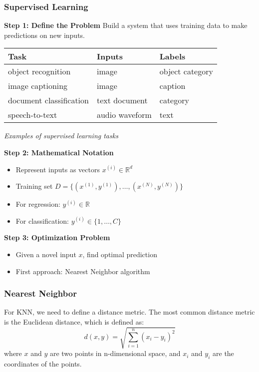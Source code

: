 \documentclass{article}
\begin{document}
\subsubsection*{Supervised Learning}

\begin{tcolorbox}[colback=gray!10!white,colframe=navyblue!70!black,title=Supervised Learning: Step-by-Step]

\textbf{Step 1: Define the Problem}
Build a system that uses training data to make predictions on new inputs.

\centering
\begin{tabular}{|l|l|l|}
\hline
\textbf{Task} & \textbf{Inputs} & \textbf{Labels} \\
\hline
object recognition & image & object category \\
image captioning & image & caption \\
document classification & text document & category \\
speech-to-text & audio waveform & text \\
\hline
\end{tabular}
\par\smallskip
\textit{Examples of supervised learning tasks}
\par
\raggedright

\textbf{Step 2: Mathematical Notation}
\begin{itemize}
  \item Represent inputs as vectors $x^{(i)} \in \mathbb{R}^d$
  \item Training set $D = \{(x^{(1)}, y^{(1)}), \ldots, (x^{(N)}, y^{(N)})\}$
  \item For regression: $y^{(i)} \in \mathbb{R}$
  \item For classification: $y^{(i)} \in \{1,\ldots,C\}$
\end{itemize}

\textbf{Step 3: Optimization Problem}
\begin{itemize}
  \item Given a novel input $x$, find optimal prediction
  \item First approach: Nearest Neighbor algorithm
\end{itemize}

\end{tcolorbox}

\subsubsection*{Nearest Neighbor}
For KNN, we need to define a distance metric. The most common distance metric is the Euclidean distance, which is defined as:
\begin{equation}
d(x, y) = \sqrt{\sum_{i=1}^{n} (x_i - y_i)^2}
\end{equation}
where $x$ and $y$ are two points in n-dimensional space, and $x_i$ and $y_i$ are the coordinates of the points.
\end{document}

